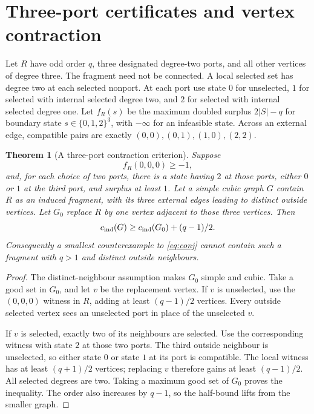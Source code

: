 \documentclass[11pt]{article}
\newtheorem{theorem}{Theorem}[section]
\begin{document}
\section{Three-port certificates and vertex contraction}
\label{sec:three-port-contraction}
Let $R$ have odd order $q$, three designated degree-two ports, and
all other vertices of degree three. The fragment need not be connected.
A local selected set has degree two at each selected nonport. At each
port use state $0$ for unselected, $1$ for selected with internal
selected degree two, and $2$ for selected with internal selected
degree one. Let $f_R(s)$ be the maximum doubled surplus $2|S|-q$
for boundary state $s\in\{0,1,2\}^3$, with $-\infty$ for an
infeasible state. Across an external edge, compatible pairs are
exactly $(0,0),(0,1),(1,0),(2,2)$.

\begin{theorem}[A three-port contraction criterion]
\label{thm:three-port-contraction}
Suppose
\[
 f_R(0,0,0)\geq-1,
\]
and, for each choice of two ports, there is a state having $2$ at
those ports, either $0$ or $1$ at the third port, and surplus at least
$1$. Let a simple cubic graph $G$ contain $R$ as an induced fragment,
with its three external edges leading to distinct outside vertices.
Let $G_0$ replace $R$ by one vertex adjacent to those three vertices.
Then
\[
 c_{\rm ind}(G)\geq c_{\rm ind}(G_0)+(q-1)/2.
\]
Consequently a smallest counterexample to \eqref{eq:conj} cannot
contain such a fragment with $q>1$ and distinct outside neighbours.
\end{theorem}
\begin{proof}
The distinct-neighbour assumption makes $G_0$ simple and cubic.
Take a good set in $G_0$, and let $v$ be the replacement vertex.
If $v$ is unselected, use the $(0,0,0)$ witness in $R$, adding at
least $(q-1)/2$ vertices. Every outside selected vertex sees an
unselected port in place of the unselected $v$.

If $v$ is selected, exactly two of its neighbours are selected.
Use the corresponding witness with state $2$ at those two ports.
The third outside neighbour is unselected, so either state $0$ or
state $1$ at its port is compatible. The local witness has at least
$(q+1)/2$ vertices; replacing $v$ therefore gains at least
$(q-1)/2$. All selected degrees are two. Taking a maximum good set
of $G_0$ proves the inequality. The order also increases by $q-1$,
so the half-bound lifts from the smaller graph.
\end{proof}
\end{document}
